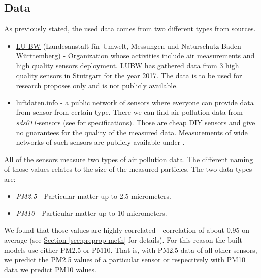 \documentclass[12pt,a4paper,twoside]{scrartcl}
\numberwithin{equation}{section}
\newcommand{\refsec}[1]{\hyperref[#1]{Section \ref*{#1}}}
\begin{document}
\subsection{Data}
\label{sec:data}

As previously stated, the used data comes from two different types from sources.
\begin{itemize}
\item \href{https://www.lubw.baden-wuerttemberg.de/startseite}{LU-BW} (Landesanstalt für Umwelt, Messungen und Naturschutz Baden-Württemberg) - Organization whose activities include air measurements and high quality sensors deployment. LUBW has gathered data from 3 high quality sensors in Stuttgart for the year 2017. The data is to be used for research proposes only and is not publicly available.
\item \href{https://luftdaten.info/}{luftdaten.info} - a public network of sensors where everyone can provide data from sensor from certain type. There we can find air pollution data from \emph{sds011}-sensors (see \cite{sds011}  for specifications). Those are cheap DIY sensors and give no guarantees for the quality of the measured data. Measurements of wide networks of such sensors are publicly available under \cite{datalink}.
\end{itemize}
All of the sensors measure two types of air pollution data. The different naming of those values relates to the size of the measured particles. The two data types are:
\begin{itemize}
\item \emph{PM2.5} - Particular matter up to 2.5 micrometers.
\item \emph{PM10} - Particular matter up to 10 micrometers.
\end{itemize}
We found that those values are highly correlated - correlation of about 0.95 on average (see \refsec{sec:preprop-meth} for details). For this reason the built models use either PM2.5 or PM10. That is, with PM2.5 data of all other sensors, we predict the PM2.5 values of a particular sensor or respectively with PM10 data we predict PM10 values.
\end{document}
